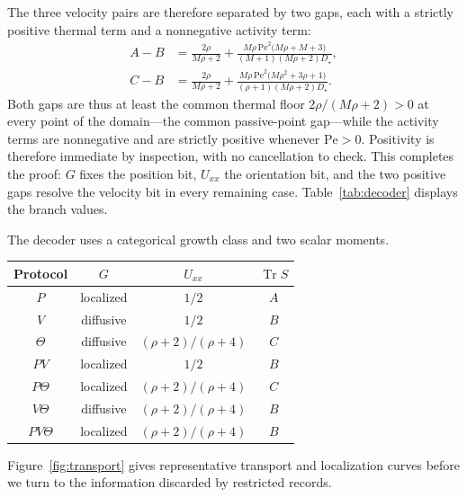 The three velocity pairs are therefore separated by two gaps, each with a strictly positive thermal term and a nonnegative activity term:
\[
\begin{aligned}
A-B&=\frac{2\rho}{M\rho+2}
+\frac{M\rho\,\mathrm{Pe}^2\bigl(M\rho+M+3\bigr)}{(M+1)(M\rho+2)D_\star},\\[3pt]
C-B&=\frac{2\rho}{M\rho+2}
+\frac{M\rho\,\mathrm{Pe}^2\bigl(M\rho^2+3\rho+1\bigr)}{(\rho+1)(M\rho+2)D_\star}.
\end{aligned}
\]
Both gaps are thus at least the common thermal floor $2\rho/(M\rho+2)>0$ at every point of the domain---the common passive-point gap---while the activity terms are nonnegative and are strictly positive whenever $\mathrm{Pe}>0$. Positivity is therefore immediate by inspection, with no cancellation to check. This completes the proof: $G$ fixes the position bit, $U_{xx}$ the orientation bit, and the two positive gaps resolve the velocity bit in every remaining case. Table~\ref{tab:decoder} displays the branch values.

The decoder uses a categorical growth class and two scalar moments.

\begin{table}[t]
{\begin{tabular}{c|c|c|c}
Protocol & $G$ & $U_{xx}$ & $\operatorname{Tr}S$\\ \hline
$P$ & localized & $1/2$ & $A$\\
$V$ & diffusive & $1/2$ & $B$\\
$\Theta$ & diffusive & $(\rho+2)/(\rho+4)$ & $C$\\
$PV$ & localized & $1/2$ & $B$\\
$P\Theta$ & localized & $(\rho+2)/(\rho+4)$ & $C$\\
$V\Theta$ & diffusive & $(\rho+2)/(\rho+4)$ & $B$\\
$PV\Theta$ & localized & $(\rho+2)/(\rho+4)$ & $B$
\end{tabular}}
\end{table}

Figure~\ref{fig:transport} gives representative transport and localization curves before we turn to the information discarded by restricted records.


